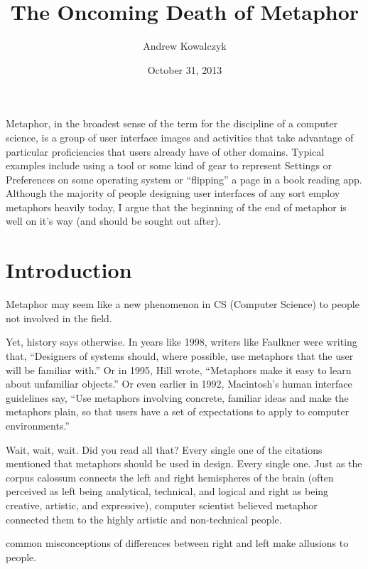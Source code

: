 \documentclass[11pt, oneside]{article}   	%
\title{The Oncoming Death of Metaphor}
\author{Andrew Kowalczyk}
\date{October 31, 2013}							%
\begin{document}
\maketitle

Metaphor, in the broadest sense of the term for the discipline of a computer science, is a group of user interface images and activities that take advantage of particular proficiencies that users already have of other domains. Typical examples include using a tool or some kind of gear to represent Settings or Preferences on some operating system or ``flipping'' a page in a book reading app.  Although the majority of people designing user interfaces of any sort employ metaphors heavily today, I argue that the beginning of the end of metaphor is well on it's way (and should be sought out after).

\section{Introduction \cite{reification}}

Metaphor may seem like a new phenomenon in CS (Computer Science) to people not involved in the field. 



Yet, history says otherwise. In years like 1998, writers like Faulkner were writing that, ``Designers of systems should, where possible, use metaphors that the user will be familiar with.'' \cite{essence}  Or in 1995, Hill wrote, ``Metaphors make it easy to learn about unfamiliar objects.'' \cite{practical} Or even earlier in 1992, Macintosh's human interface guidelines say, ``Use metaphors involving concrete, familiar ideas and make the metaphors plain, so that users have a set of expectations to apply to computer environments.'' \cite{apple}

Wait, wait, wait. Did you read all that? Every single one of the citations mentioned that metaphors should be used in design. Every single one. Just as the corpus calossum connects the left and right hemispheres of the brain (often perceived as left being analytical, technical, and logical and right as being creative, artistic, and expressive), computer scientist believed metaphor connected them to the highly artistic and non-technical people. 

common misconceptions of differences between right and left make allusions to people.
\end{document}
